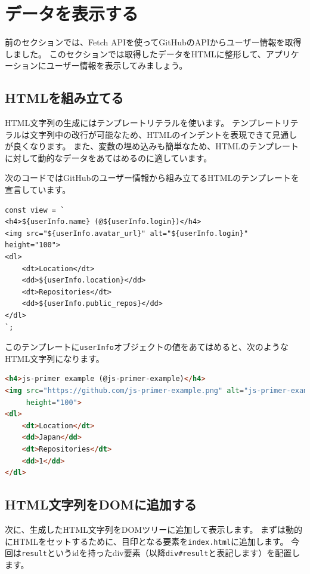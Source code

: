 \hypertarget{display-data}{%
\section{データを表示する}\label{display-data}}

前のセクションでは、Fetch
APIを使ってGitHubのAPIからユーザー情報を取得しました。
このセクションでは取得したデータをHTMLに整形して、アプリケーションにユーザー情報を表示してみましょう。

\hypertarget{markup-html}{%
\subsection{HTMLを組み立てる}\label{markup-html}}

HTML文字列の生成にはテンプレートリテラルを使います。
テンプレートリテラルは文字列中の改行が可能なため、HTMLのインデントを表現できて見通しが良くなります。
また、変数の埋め込みも簡単なため、HTMLのテンプレートに対して動的なデータをあてはめるのに適しています。

次のコードではGitHubのユーザー情報から組み立てるHTMLのテンプレートを宣言しています。

\begin{lstlisting}
const view = `
<h4>${userInfo.name} (@${userInfo.login})</h4>
<img src="${userInfo.avatar_url}" alt="${userInfo.login}" height="100">
<dl>
    <dt>Location</dt>
    <dd>${userInfo.location}</dd>
    <dt>Repositories</dt>
    <dd>${userInfo.public_repos}</dd>
</dl>
`;
\end{lstlisting}

このテンプレートに\texttt{userInfo}オブジェクトの値をあてはめると、次のようなHTML文字列になります。

\begin{lstlisting}[language=HTML]
<h4>js-primer example (@js-primer-example)</h4>
<img src="https://github.com/js-primer-example.png" alt="js-primer-example" 
     height="100">
<dl>
    <dt>Location</dt>
    <dd>Japan</dd>
    <dt>Repositories</dt>
    <dd>1</dd>
</dl>
\end{lstlisting}

\hypertarget{html-to-dom}{%
\subsection{HTML文字列をDOMに追加する}\label{html-to-dom}}

次に、生成したHTML文字列をDOMツリーに追加して表示します。
まずは動的にHTMLをセットするために、目印となる要素を\texttt{index.html}に追加します。
今回は\texttt{result}というidを持ったdiv要素（以降\texttt{div\#result}と表記します）を配置します。

